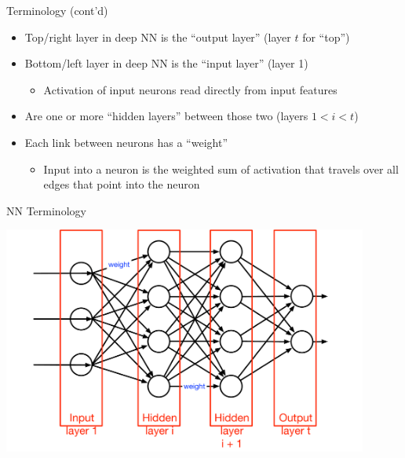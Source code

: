 \documentclass[aspectratio=169]{beamer}
\begin{document}
\begin{frame}{Terminology (cont'd)}

\begin{itemize}
	\item Top/right layer in deep NN is the ``output layer'' (layer $t$ for ``top'')
	\item Bottom/left layer in deep NN is the ``input layer'' (layer 1)
	\begin{itemize}
                \item Activation of input neurons read directly from input features
	\end{itemize}	
	\item Are one or more ``hidden layers'' between those two (layers $1 < i < t$)
	\item Each link between neurons has a ``weight''
	\begin{itemize}
                \item Input into a neuron is the weighted sum of activation that travels over all edges that
		point into the neuron
	\end{itemize}	
\end{itemize}
\end{frame}
\begin{frame}{NN Terminology}

\includegraphics[width=0.9\textwidth]{lectFF/nnTerms2.pdf}
\end{frame}
\end{document}
